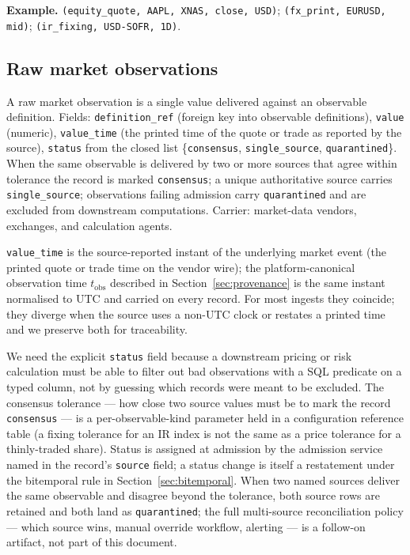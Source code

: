 \documentclass[11pt,a4paper]{article}
\begin{document}
\textbf{Example.} \texttt{(equity\_quote, AAPL, XNAS, close, USD)}; \texttt{(fx\_print, EURUSD, mid)}; \texttt{(ir\_fixing, USD-SOFR, 1D)}.

\subsection{Raw market observations}

A raw market observation is a single value delivered against an observable definition. Fields: \texttt{definition\_ref} (foreign key into observable definitions), \texttt{value} (numeric), \texttt{value\_time} (the printed time of the quote or trade as reported by the source), \texttt{status} from the closed list \{\texttt{consensus}, \texttt{single\_source}, \texttt{quarantined}\}. When the same observable is delivered by two or more sources that agree within tolerance the record is marked \texttt{consensus}; a unique authoritative source carries \texttt{single\_source}; observations failing admission carry \texttt{quarantined} and are excluded from downstream computations. Carrier: market-data vendors, exchanges, and calculation agents.

\texttt{value\_time} is the source-reported instant of the underlying market event (the printed quote or trade time on the vendor wire); the platform-canonical observation time $t_\text{obs}$ described in Section~\ref{sec:provenance} is the same instant normalised to UTC and carried on every record. For most ingests they coincide; they diverge when the source uses a non-UTC clock or restates a printed time and we preserve both for traceability.

We need the explicit \texttt{status} field because a downstream pricing or risk calculation must be able to filter out bad observations with a SQL predicate on a typed column, not by guessing which records were meant to be excluded. The consensus tolerance --- how close two source values must be to mark the record \texttt{consensus} --- is a per-observable-kind parameter held in a configuration reference table (a fixing tolerance for an IR index is not the same as a price tolerance for a thinly-traded share). Status is assigned at admission by the admission service named in the record's \texttt{source} field; a status change is itself a restatement under the bitemporal rule in Section~\ref{sec:bitemporal}. When two named sources deliver the same observable and disagree beyond the tolerance, both source rows are retained and both land as \texttt{quarantined}; the full multi-source reconciliation policy --- which source wins, manual override workflow, alerting --- is a follow-on artifact, not part of this document.
\end{document}

